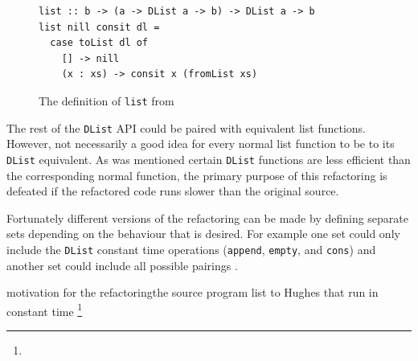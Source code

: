 \begin{figure}[t]
\begin{lstlisting}
list :: b -> (a -> DList a -> b) -> DList a -> b
list nill consit dl =
  case toList dl of
    [] -> nill
    (x : xs) -> consit x (fromList xs)
\end{lstlisting}
\caption{The definition of \texttt{list} from~\citep{dlist}}
\label{dListList}
\end{figure}

The rest of the \texttt{DList} API could be paired with equivalent list functions. However, \DIFdelbegin {}\DIFdelend \DIFaddbegin {}\DIFaddend not necessarily a good idea for every normal list function to be \DIFdelbegin {}\DIFdelend \DIFaddbegin {}\DIFaddend to its \texttt{DList} equivalent. As was mentioned \DIFaddbegin {}\DIFaddend certain \texttt{DList} functions are less efficient than the corresponding normal function, \DIFaddbegin {}\DIFaddend the primary purpose of this refactoring is defeated if the refactored code runs slower than the original source.

Fortunately different versions of the refactoring can be made by defining separate sets depending on the behaviour that is desired. For example one set could only include the \texttt{DList} constant time operations (\texttt{append}, \texttt{empty}, and \texttt{cons}) and another set could include all possible pairings \DIFaddbegin {}\DIFaddend .

\DIFdelbegin {}\DIFdelend \DIFaddbegin {}\DIFaddend motivation for the refactoring\DIFdelbegin {}\DIFdelend \DIFaddbegin {}\DIFaddend the source program \DIFdelbegin {}\DIFdelend \DIFaddbegin {}\DIFaddend list to Hughes \DIFdelbegin {}\texttt{} %
\DIFdelend \DIFaddbegin {}\DIFaddend that run in constant time \DIFdelbegin {}\footnote{\texttt{}%
\DIFdel{, }\texttt{}%
\texttt{}%
}%
\addtocounter{footnote}{-1}%

